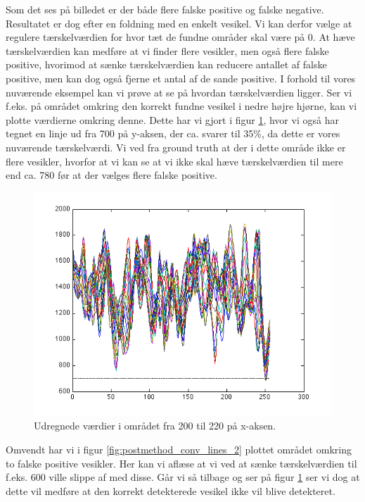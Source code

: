 Som det ses på billedet er der både flere falske positive og falske negative. Resultatet er dog efter en foldning med en enkelt vesikel. Vi kan derfor vælge at regulere tærskelværdien for hvor tæt de fundne områder skal være på 0. At hæve tærskelværdien kan medføre at vi finder flere vesikler, men også flere falske positive, hvorimod at sænke tærskelværdien kan reducere antallet af falske positive, men kan dog også fjerne et antal af de sande positive. I forhold til vores nuværende eksempel kan vi prøve at se på hvordan tærskelværdien ligger. Ser vi f.eks. på området omkring den korrekt fundne vesikel i nedre højre hjørne, kan vi plotte værdierne omkring denne. Dette har vi gjort i figur \ref{fig:postmethod_conv_lines_1}, hvor vi også har tegnet en linje ud fra 700 på y-aksen, der ca. svarer til 35\%, da dette er vores nuværende tærskelværdi. Vi ved fra ground truth at der i dette område ikke er flere vesikler, hvorfor at vi kan se at vi ikke skal hæve tærskelværdien til mere end ca. 780 før at der vælges flere falske positive. 

\begin{figure}[H]
		\centering
		\includegraphics[scale=0.9]{files/postmethod/img/conv_lines_1.png}
	\caption{Udregnede værdier i området fra 200 til 220 på x-aksen. \label{fig:postmethod_conv_lines_1}}
\end{figure}

Omvendt har vi i figur \ref{fig:postmethod_conv_lines_2} plottet området omkring to falske positive vesikler. Her kan vi aflæse at vi ved at sænke tærskelværdien til f.eks. 600 ville slippe af med disse. Går vi så tilbage og ser på figur \ref{fig:postmethod_conv_lines_1} ser vi dog at dette vil medføre at den korrekt detekterede vesikel ikke vil blive detekteret.

